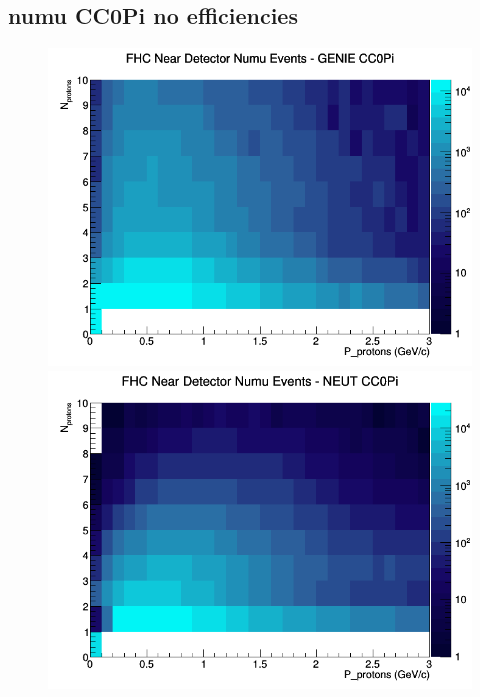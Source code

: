 \documentclass[12pt]{article}
\begin{document}
\subsection{numu CC0Pi no efficiencies}
\begin{figure}[h]
\includegraphics[width=\linewidth]{N_P/nominal/protons/CC0Pi_FHC_ND_numu_N_P_GENIE.png}
\endminipage
{}
\includegraphics[width=\linewidth]{N_P/nominal/protons/CC0Pi_FHC_ND_numu_N_P_NEUT.png}
\endminipage
{}

\end{figure}
\end{document}
